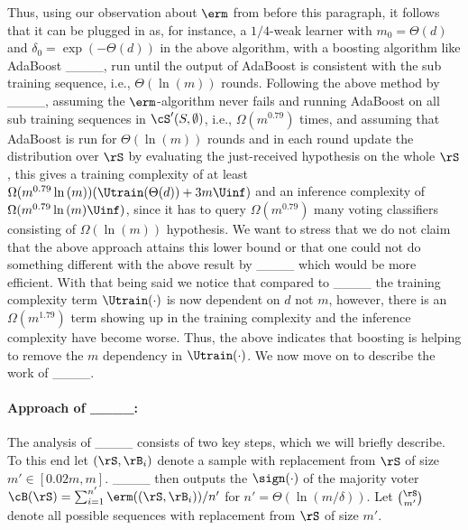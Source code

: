 Thus, using our observation about $ \erm $ from before this paragraph, it follows that it can be plugged in as, for instance, a $ 1/4 $-weak learner with $ m_{0}=\Theta(d) $ and $ \delta_{0}= \exp{\left(-\Theta(d) \right)}  $  in the above algorithm, with a boosting algorithm like AdaBoost ____, run until the output of AdaBoost is consistent with the sub training sequence, i.e., $ \Theta(\ln{\left(m \right)}) $ rounds. Following the above method by ____, assuming the $ \erm $-algorithm never fails and running AdaBoost on all sub training sequences in $\cS'(S,\emptyset) $, i.e., $ \Omega(m^{0.79}) $ times, and assuming that AdaBoost is run for $ \Theta(\ln(m)) $ rounds and in each round update the distribution over $ \rS $ by evaluating the just-received hypothesis on the whole $ \rS $, this gives a training complexity of at least $ \Omega(m^{0.79}\ln{\left(m \right)})(\Utrain(\Theta(d))+3m\Uinf) $ and an inference complexity of $\Omega( m^{0.79}\ln{(m )} \Uinf)$, since it has to query $ \Omega(m^{0.79})$ many voting classifiers consisting of $ \Omega(\ln{(m )}) $ hypothesis. We want to stress that we do not claim that the above approach attains this lower bound or that one could not do something different with the above result by ____ which would be more efficient. With that being said we notice that compared to ____  the training complexity term $ \Utrain(\cdot) $ is now dependent on $ d $ not $ m $, however, there is an $ \Omega(m^{1.79}) $ term showing up in the training complexity and the inference complexity have become worse. Thus, the above indicates that boosting is helping to remove the $ m $ dependency in $ \Utrain(\cdot) $. We now move on to describe the work of ____.

\paragraph{Approach of ____:}
The analysis of ____ consists of two key steps, which we will briefly describe. To this end let $(\rS,\rB_{i})$ denote a sample with replacement from $\rS$ of size $ m'\in[0.02m,m]$. ____ then outputs the $ \sign(\cdot) $ of the majority voter $\cB(\rS)=\sum_{i=1}^{n'} \erm((\rS,\rB_{i}))/n'$ for $n'=\Theta(\ln{\left(m/\delta \right)})$. Let $\binom{\rS}{m'}$ denote all possible sequences with replacement from $\rS$ of size $m'$.  

